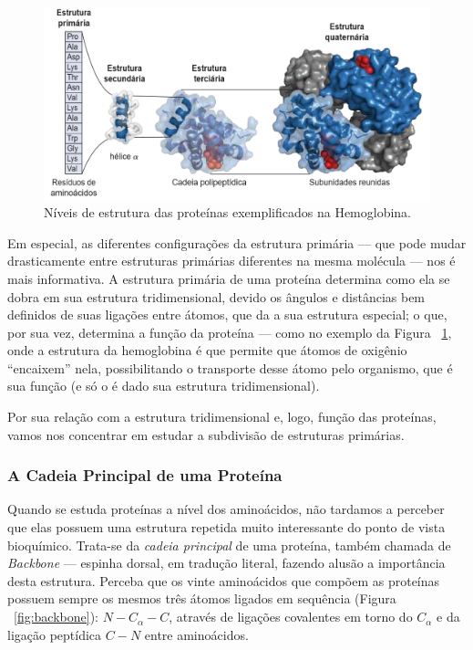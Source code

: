 \documentclass[a4paper,12pt]{article}
\begin{document}
	\begin{figure}[H]
		\begin{center}
			\includegraphics[width=1\linewidth]{protest.png}
		\end{center}
		\caption{Níveis de estrutura das proteínas exemplificados na Hemoglobina.}
		\label{fig:protest}
	\end{figure}
	
	Em especial, as diferentes configurações da estrutura primária --- que pode mudar drasticamente entre estruturas primárias diferentes na mesma molécula --- nos é mais informativa. A estrutura primária de uma proteína determina como ela se dobra em sua estrutura tridimensional, devido os ângulos e distâncias bem definidos de suas ligações entre átomos, que da a sua estrutura especial; o que, por sua vez, determina a função da proteína --- como no exemplo da Figura ~\ref{fig:protest}, onde a estrutura da hemoglobina é que permite que átomos de oxigênio ``encaixem'' nela, possibilitando o transporte desse átomo pelo organismo, que é sua função (e só o é dado sua estrutura tridimensional). 
	
	Por sua relação com a estrutura tridimensional e, logo, função das proteínas, vamos nos concentrar em estudar a subdivisão de estruturas primárias. 
	
	\subsubsection*{A Cadeia Principal de uma Proteína}
	Quando se estuda proteínas a nível dos aminoácidos, não tardamos a perceber que elas possuem uma estrutura repetida muito interessante do ponto de vista bioquímico. Trata-se da \textit{cadeia principal} de uma proteína, também chamada de \textit{Backbone} --- espinha dorsal, em tradução literal, fazendo alusão a importância desta estrutura. Perceba que os vinte aminoácidos que compõem as proteínas possuem sempre os mesmos três átomos ligados em sequência (Figura ~\ref{fig:backbone}): $N-C_\alpha-C$, através de ligações covalentes em torno do $C_\alpha$ e da ligação peptídica $C-N$ entre aminoácidos.
	
\end{document}
